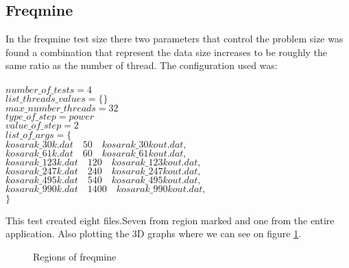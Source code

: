 \documentclass[sigconf]{acmart}
\begin{document}
\subsection{Freqmine}
In the freqmine test size there two parameters that control the problem size was found a combination that represent the data size increases to be roughly the same ratio as the number of thread. The configuration used was:
\\
\\
$number\_of\_tests=4$ \\
$list\_threads\_values=\{\}$ \\
$max\_number\_threads=32$ \\
$type\_of\_step=power$ \\
$value\_of\_step=2$ \\
$list\_of\_args=\{$ \\
$kosarak\_30k.dat \quad 50 \quad kosarak\_30kout.dat,$\\
$kosarak\_61k.dat \quad 60 \quad kosarak\_61kout.dat,$\\
$kosarak\_123k.dat \quad 120 \quad kosarak\_123kout.dat,$\\
$kosarak\_247k.dat \quad 240 \quad kosarak\_247kout.dat,$\\
$kosarak\_495k.dat \quad 540 \quad kosarak\_495kout.dat,$\\
$kosarak\_990k.dat \quad 1400 \quad kosarak\_990kout.dat,$\\
$\}$

This test created eight files.Seven from region marked and one from the entire application. Also plotting the 3D graphs where we can see on figure \ref{fig:freqRegions}.

\begin{figure}[H]
     \centering
     
\end{figure}
 
\begin{figure}[H]
     \centering
     \ContinuedFloat
     
     
     \caption{Regions of freqmine}
     \label{fig:freqRegions}
\end{figure}
\end{document}
